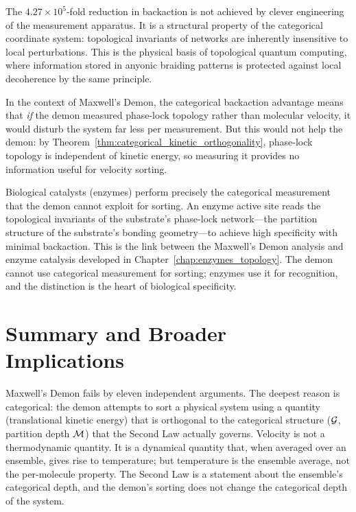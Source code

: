 \begin{remark}
The $4.27 \times 10^5$-fold reduction in backaction is not achieved by clever
engineering of the measurement apparatus. It is a structural property of the
categorical coordinate system: topological invariants of networks are inherently
insensitive to local perturbations. This is the physical basis of topological
quantum computing, where information stored in anyonic braiding patterns is
protected against local decoherence by the same principle.

In the context of Maxwell's Demon, the categorical backaction advantage means
that \emph{if} the demon measured phase-lock topology rather than molecular
velocity, it would disturb the system far less per measurement. But this would
not help the demon: by Theorem~\ref{thm:categorical_kinetic_orthogonality},
phase-lock topology is independent of kinetic energy, so measuring it provides
no information useful for velocity sorting.
\end{remark}

\begin{corollary}
\label{cor:demon_to_catalysis}
Biological catalysts (enzymes) perform precisely the categorical measurement
that the demon cannot exploit for sorting. An enzyme active site reads the
topological invariants of the substrate's phase-lock network---the partition
structure of the substrate's bonding geometry---to achieve high specificity
with minimal backaction. This is the link between the Maxwell's Demon analysis
and enzyme catalysis developed in Chapter~\ref{chap:enzymes_topology}. The
demon cannot use categorical measurement for sorting; enzymes use it for
recognition, and the distinction is the heart of biological specificity.
\end{corollary}

\section{Summary and Broader Implications}
\label{sec:demon_summary}

Maxwell's Demon fails by eleven independent arguments. The deepest reason
is categorical: the demon attempts to sort a physical system using a quantity
(translational kinetic energy) that is orthogonal to the categorical structure
($\mathcal{G}$, partition depth $\mathcal{M}$) that the Second Law actually
governs. Velocity is not a thermodynamic quantity. It is a dynamical quantity
that, when averaged over an ensemble, gives rise to temperature; but temperature
is the ensemble average, not the per-molecule property. The Second Law is a
statement about the ensemble's categorical depth, and the demon's sorting does
not change the categorical depth of the system.

